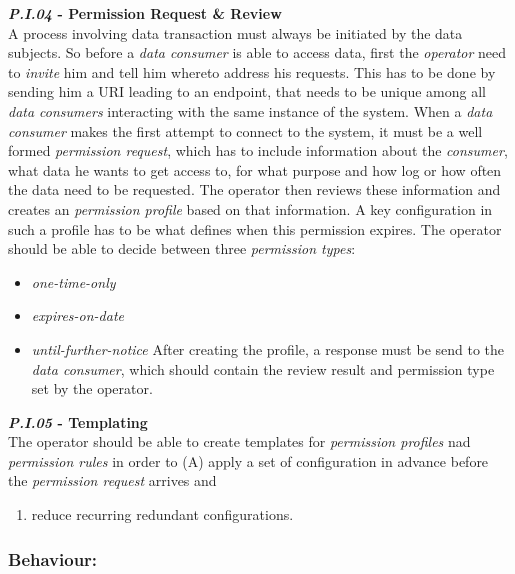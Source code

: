 \documentclass[12pt,english,a4paper,titlepage,cleardoublepage=empty,dottedtoc]{report}
\providecommand{\tightlist}{%
  \setlength{\itemsep}{0pt}\setlength{\parskip}{0pt}}
\begin{document}
\textbf{\emph{\protect\hypertarget{pi04}{}{P.I.04}} - Permission Request
\& Review}\\
A process involving data transaction must always be initiated by the
data subjects. So before a \emph{data consumer} is able to access data,
first the \emph{operator} need to \emph{invite} him and tell him whereto
address his requests. This has to be done by sending him a URI leading
to an endpoint, that needs to be unique among all \emph{data consumers}
interacting with the same instance of the system. When a \emph{data
consumer} makes the first attempt to connect to the system, it must be a
well formed \emph{permission request}, which has to include information
about the \emph{consumer}, what data he wants to get access to, for what
purpose and how log or how often the data need to be requested. The
operator then reviews these information and creates an \emph{permission
profile} based on that information. A key configuration in such a
profile has to be what defines when this permission expires. The
operator should be able to decide between three \emph{permission types}:

\begin{itemize}
\tightlist
\item
  \emph{one-time-only}
\item
  \emph{expires-on-date}
\item
  \emph{until-further-notice} After creating the profile, a response
  must be send to the \emph{data consumer}, which should contain the
  review result and permission type set by the operator.
\end{itemize}

\textbf{\emph{\protect\hypertarget{pi05}{}{P.I.05}} - Templating}\\
The operator should be able to create templates for \emph{permission
profiles} nad \emph{permission rules} in order to (A) apply a set of
configuration in advance before the \emph{permission request} arrives
and

\begin{enumerate}
\def\labelenumi{(\Alph{enumi})}
\setcounter{enumi}{1}
\tightlist
\item
  reduce recurring redundant configurations.
\end{enumerate}

\subsubsection{Behaviour:}\label{behaviour}
\end{document}
